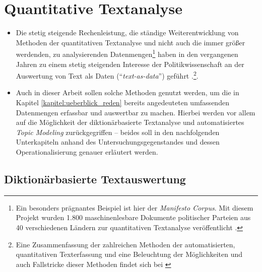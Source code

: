 \documentclass[12pt, 
    twoside=false, 
    bibliography=totoc, 
    numbers=endperiod, 
    headings=normal, 
    toc=chapterentrydotfill
    ]{scrbook}
\begin{document}
\section{Quantitative Textanalyse}

\begin{itemize}
    \item Die stetig steigende Rechenleistung, die ständige Weiterentwicklung von Methoden der quantitativen Textanalyse und nicht auch die immer größer werdenden, zu analysierenden Datenmengen\footnote{Ein besonders prägnantes Beispiel ist hier der \emph{Manifesto Corpus}. Mit diesem Projekt wurden 1.800 maschinenlesbare Dokumente politischer Parteien aus 40 verschiedenen Ländern zur quantitativen Textanalyse veröffentlicht \parencite{merz_2016}.} haben in den vergangenen Jahren zu einem stetig steigenden Interesse der Politikwissenschaft an der Auswertung von Text als Daten (\enquote{\emph{text-as-data}}) geführt \parencite[vgl.][]{wilkerson_2017}.\footnote{Eine Zusammenfassung der zahlreichen Methoden der automatisierten, quantitativen Texterfassung und eine Beleuchtung der Möglichkeiten und auch Fallstricke dieser Methoden findet sich bei \textcite{grimmer_2013}}.
    \item Auch in dieser Arbeit sollen solche Methoden genutzt werden, um die in Kapitel \ref{kapitel:ueberblick_reden} bereits angedeuteten umfassenden Datenmengen erfassbar und auswertbar zu machen. Hierbei werden vor allem auf die Möglichkeit der diktionärbasierte Textanalyse und automatisiertes \emph{Topic Modeling} zurückgegriffen -- beides soll in den nachfolgenden Unterkapiteln anhand des Untersuchungsgegenstandes und dessen Operationalisierung genauer erläutert werden.
\end{itemize}

\subsection{Diktionärbasierte Textauswertung}
\end{document}
